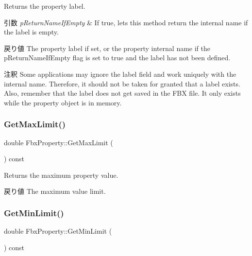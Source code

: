 Returns the property label. 
\begin{DoxyParams}{引数}
{\em p\+Return\+Name\+If\+Empty} & If {\ttfamily true}, lets this method return the internal name if the label is empty. \\
\hline
\end{DoxyParams}
\begin{DoxyReturn}{戻り値}
The property label if set, or the property internal name if the p\+Return\+Name\+If\+Empty flag is set to {\ttfamily true} and the label has not been defined. 
\end{DoxyReturn}
\begin{DoxyRemark}{注釈}
Some applications may ignore the label field and work uniquely with the internal name. Therefore, it should not be taken for granted that a label exists. Also, remember that the label does not get saved in the F\+BX file. It only exists while the property object is in memory. 
\end{DoxyRemark}
\mbox{\label{class_fbx_property_a1cdf4161465d3b988b23b9fe05fa22b4}} 
\subsubsection{\texorpdfstring{Get\+Max\+Limit()}{GetMaxLimit()}}
{\footnotesize\ttfamily double Fbx\+Property\+::\+Get\+Max\+Limit (\begin{DoxyParamCaption}{ }\end{DoxyParamCaption}) const}

Returns the maximum property value. \begin{DoxyReturn}{戻り値}
The maximum value limit. 
\end{DoxyReturn}
\mbox{\label{class_fbx_property_abdc5ccbaea5c1e32d7b1ccfa3fd826af}} 
\subsubsection{\texorpdfstring{Get\+Min\+Limit()}{GetMinLimit()}}
{\footnotesize\ttfamily double Fbx\+Property\+::\+Get\+Min\+Limit (\begin{DoxyParamCaption}{ }\end{DoxyParamCaption}) const}


